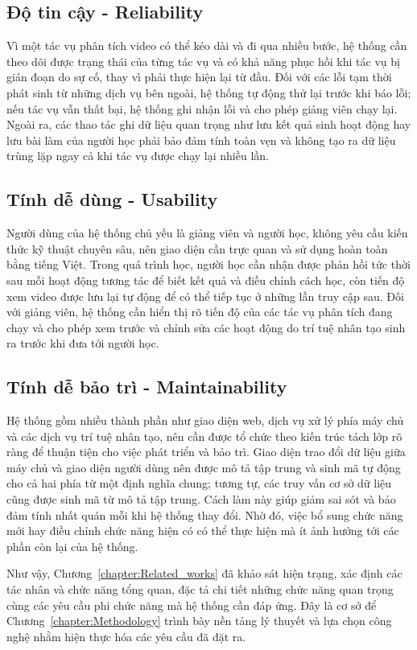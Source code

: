 \documentclass[../DoAn.tex]{subfiles}
\begin{document}
\subsection{Độ tin cậy - Reliability}
Vì một tác vụ phân tích video có thể kéo dài và đi qua nhiều bước, hệ thống cần theo dõi được trạng thái của từng tác vụ và có khả năng phục hồi khi tác vụ bị gián đoạn do sự cố, thay vì phải thực hiện lại từ đầu. Đối với các lỗi tạm thời phát sinh từ những dịch vụ bên ngoài, hệ thống tự động thử lại trước khi báo lỗi; nếu tác vụ vẫn thất bại, hệ thống ghi nhận lỗi và cho phép giảng viên chạy lại. Ngoài ra, các thao tác ghi dữ liệu quan trọng như lưu kết quả sinh hoạt động hay lưu bài làm của người học phải bảo đảm tính toàn vẹn và không tạo ra dữ liệu trùng lặp ngay cả khi tác vụ được chạy lại nhiều lần.

\subsection{Tính dễ dùng - Usability}
Người dùng của hệ thống chủ yếu là giảng viên và người học, không yêu cầu kiến thức kỹ thuật chuyên sâu, nên giao diện cần trực quan và sử dụng hoàn toàn bằng tiếng Việt. Trong quá trình học, người học cần nhận được phản hồi tức thời sau mỗi hoạt động tương tác để biết kết quả và điều chỉnh cách học, còn tiến độ xem video được lưu lại tự động để có thể tiếp tục ở những lần truy cập sau. Đối với giảng viên, hệ thống cần hiển thị rõ tiến độ của các tác vụ phân tích đang chạy và cho phép xem trước và chỉnh sửa các hoạt động do trí tuệ nhân tạo sinh ra trước khi đưa tới người học.

\subsection{Tính dễ bảo trì - Maintainability}
Hệ thống gồm nhiều thành phần như giao diện web, dịch vụ xử lý phía máy chủ và các dịch vụ trí tuệ nhân tạo, nên cần được tổ chức theo kiến trúc tách lớp rõ ràng để thuận tiện cho việc phát triển và bảo trì. Giao diện trao đổi dữ liệu giữa máy chủ và giao diện người dùng nên được mô tả tập trung và sinh mã tự động cho cả hai phía từ một định nghĩa chung; tương tự, các truy vấn cơ sở dữ liệu cũng được sinh mã từ mô tả tập trung. Cách làm này giúp giảm sai sót và bảo đảm tính nhất quán mỗi khi hệ thống thay đổi. Nhờ đó, việc bổ sung chức năng mới hay điều chỉnh chức năng hiện có có thể thực hiện mà ít ảnh hưởng tới các phần còn lại của hệ thống.

Như vậy, Chương~\ref{chapter:Related_works} đã khảo sát hiện trạng, xác định các tác nhân và chức năng tổng quan, đặc tả chi tiết những chức năng quan trọng cùng các yêu cầu phi chức năng mà hệ thống cần đáp ứng. Đây là cơ sở để Chương~\ref{chapter:Methodology} trình bày nền tảng lý thuyết và lựa chọn công nghệ nhằm hiện thực hóa các yêu cầu đã đặt ra.


\end{document}
